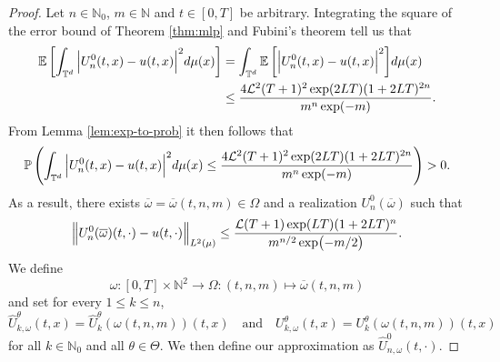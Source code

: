 \documentclass{article}
\numberwithin{equation}{section}
\newcommand{\T}{\mathbb{T}}
\newcommand{\R}{\mathbb{R}}
\newcommand{\N}{\mathbb{N}}
\newcommand{\cL}{\mathcal{L}}
\newcommand{\mlp}{U}
\newcommand{\1}{\mathbbm{1}}
\newcommand{\Uhat}{\widehat{U}}
\newcommand{\E}[1]{{\mathbb{E}\left[ #1 \right]}} %
\newcommand{\Prob}[1]{{\mathbb{P}\left( #1 \right)}} %
\begin{document}
\begin{proof}
Let $n\in\N_0$, $m\in\N$ and $t\in [0,T]$ be arbitrary. 
Integrating the square of the error bound of Theorem \ref{thm:mlp} and Fubini's theorem tell us that
\begin{equation}\label{eq:fubini}
\begin{split}
   \E{\int_{\T^d}\abs{U^0_n(t,x)-u(t,x)}^2d\mu(x)} &= \int_{\T^d} \E{\abs{U^0_n(t,x)-u(t,x)}^2} d\mu(x)\\
   &\leq \frac{4\cL^2 (T+1)^2\exp(2LT)(1+2LT)^{2n}}{m^{n}\exp(-m)}. 
\end{split}
\end{equation}
From Lemma \ref{lem:exp-to-prob} it then follows that
\begin{equation}
    \Prob{\int_{\T^d}\abs{U^0_n(t,x)-u(t,x)}^2d\mu(x) \leq \frac{4\cL^2 (T+1)^2\exp(2LT)(1+2LT)^{2n}}{m^{n}\exp(-m)}} > 0. 
\end{equation}
As a result, there exists $\overline{\omega}=\overline{\omega}(t,n,m)\in \Omega$ and a realization $U^0_n(\overline{\omega})$ such that
\begin{equation}\label{eq:true-to-mlp}
    \norm{U^0_n(\overline{\omega})(t,\cdot)-u(t,\cdot)}_{L^2(\mu)} \leq \frac{\cL (T+1)\exp(LT)(1+2LT)^n}{m^{n/2}\exp(-m/2)}. 
\end{equation}
We define 
\begin{equation}\label{eq:omega}
    \omega : [0,T]\times \N^2\to \Omega: (t,n,m)\mapsto \overline{\omega}(t,n,m)
\end{equation}
and set for every $1\leq k\leq n$,
\begin{equation}\label{eq:def-nn}
    \Uhat_{k,\omega}^\theta(t,x) = \Uhat_k^\theta(\omega(t,n,m))(t,x)\quad \text{and} \quad \mlp_{k,\omega}^\theta(t,x) = \mlp_k^\theta(\omega(t,n,m))(t,x)
\end{equation}
for all $k\in\N_0$ and all $\theta\in\Theta$. We then define our approximation as $\Uhat_{n,\omega}^0(t,\cdot)$.


\end{proof}
\end{document}

